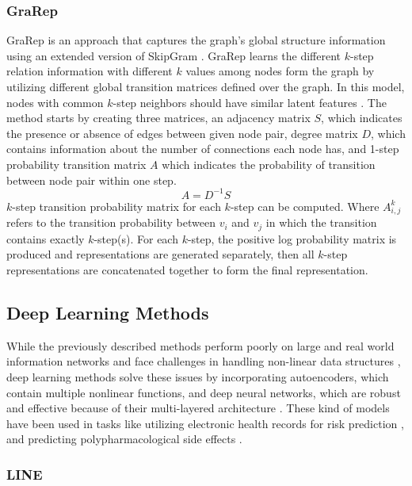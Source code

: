 \subsubsection{GraRep}

\ac{GraRep} is an approach that captures the graph’s global structure information using an extended version of SkipGram \cite{cao_grarep:_2015}.
\ac{GraRep} learns the different $k$-step relation information with different $k$ values among nodes form the graph by utilizing different global transition matrices defined over the graph.
In this model, nodes with common $k$-step neighbors should have similar latent features \cite{cao_grarep:_2015}.
The method starts by creating three matrices, an adjacency matrix $S$, which indicates the presence or absence of edges between given node pair, degree matrix $D$, which contains information about the number of connections each node has, and 1-step probability transition matrix $A$ which indicates the probability of transition between node pair within one step.
\begin{equation}
    \label{eq:grarep_01}
    A = D^{-1}S
\end{equation}
$k$-step transition probability matrix for each $k$-step can be computed.
Where $A^{k}_{i,j}$ refers to the transition probability between $v_{i}$ and $v_{j}$ in which the transition contains exactly $k$-step(s).
For each $k$-step, the positive log probability matrix is produced and representations are generated separately, then all $k$-step representations are concatenated together to form the final representation.

\subsection{Deep Learning Methods}

While the previously described methods perform poorly on large and real world information networks and face challenges in handling non-linear data structures \cite{cui_survey_2017}, deep learning methods solve these issues by incorporating autoencoders, which contain multiple nonlinear functions, and deep neural networks, which are robust and effective because of their multi-layered architecture \cite{cai_comprehensive_2017}.
These kind of models have been used in tasks like utilizing electronic health records for risk prediction \cite{cheng_risk_2016}, and predicting polypharmacological side effects \cite{zitnik_modeling_2018}.

\subsubsection{LINE}

